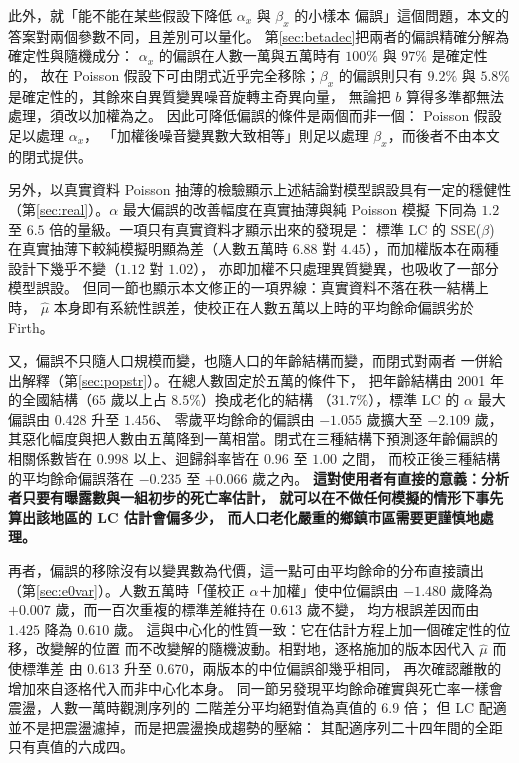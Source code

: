 \documentclass[UTF8, fontset=macnew, a4paper, 12pt]{ctexart}
\begin{document}
此外，就「能不能在某些假設下降低 $\alpha_x$ 與 $\beta_x$ 的小樣本
偏誤」這個問題，本文的答案對兩個參數不同，且差別可以量化。
第\ref{sec:betadec}把兩者的偏誤精確分解為確定性與隨機成分：
$\alpha_x$ 的偏誤在人數一萬與五萬時有 $100\%$ 與 $97\%$ 是確定性的，
故在 Poisson 假設下可由閉式近乎完全移除；$\beta_x$ 的偏誤則只有
$9.2\%$ 與 $5.8\%$ 是確定性的，其餘來自異質變異噪音旋轉主奇異向量，
無論把 $b$ 算得多準都無法處理，須改以加權為之。
因此可降低偏誤的條件是兩個而非一個： Poisson 假設足以處理 $\alpha_x$，
「加權後噪音變異數大致相等」則足以處理 $\beta_x$，而後者不由本文的閉式提供。

另外，以真實資料 Poisson 抽薄的檢驗顯示上述結論對模型誤設具有一定的穩健性
（第\ref{sec:real}）。$\alpha$ 最大偏誤的改善幅度在真實抽薄與純 Poisson 模擬
下同為 $1.2$ 至 $6.5$ 倍的量級。一項只有真實資料才顯示出來的發現是：
標準 LC 的 SSE($\beta$) 在真實抽薄下較純模擬明顯為差（人數五萬時 $6.88$
對 $4.45$），而加權版本在兩種設計下幾乎不變（$1.12$ 對 $1.02$），
亦即加權不只處理異質變異，也吸收了一部分模型誤設。
但同一節也顯示本文修正的一項界線：真實資料不落在秩一結構上時，
$\hat\mu$ 本身即有系統性誤差，使校正在人數五萬以上時的平均餘命偏誤劣於
Firth。

又，偏誤不只隨人口規模而變，也隨人口的年齡結構而變，而閉式對兩者
一併給出解釋（第\ref{sec:popstr}）。在總人數固定於五萬的條件下，
把年齡結構由 2001 年的全國結構（$65$ 歲以上占 $8.5\%$）換成老化的結構
（$31.7\%$），標準 LC 的 $\alpha$ 最大偏誤由 $0.428$ 升至 $1.456$、
零歲平均餘命的偏誤由 $-1.055$ 歲擴大至 $-2.109$ 歲，
其惡化幅度與把人數由五萬降到一萬相當。閉式在三種結構下預測逐年齡偏誤的
相關係數皆在 $0.998$ 以上、迴歸斜率皆在 $0.96$ 至 $1.00$ 之間，
而校正後三種結構的平均餘命偏誤落在 $-0.235$ 至 $+0.066$ 歲之內。
\textbf{這對使用者有直接的意義：分析者只要有曝露數與一組初步的死亡率估計，
就可以在不做任何模擬的情形下事先算出該地區的 LC 估計會偏多少，
而人口老化嚴重的鄉鎮市區需要更謹慎地處理。}

再者，偏誤的移除沒有以變異數為代價，這一點可由平均餘命的分布直接讀出
（第\ref{sec:e0var}）。人數五萬時「僅校正 $\alpha$＋加權」使中位偏誤由
$-1.480$ 歲降為 $+0.007$ 歲，而一百次重複的標準差維持在 $0.613$ 歲不變，
均方根誤差因而由 $1.425$ 降為 $0.610$ 歲。
這與中心化的性質一致：它在估計方程上加一個確定性的位移，改變解的位置
而不改變解的隨機波動。相對地，逐格施加的版本因代入 $\hat\mu$ 而使標準差
由 $0.613$ 升至 $0.670$，兩版本的中位偏誤卻幾乎相同，
再次確認離散的增加來自逐格代入而非中心化本身。
同一節另發現平均餘命確實與死亡率一樣會震盪，人數一萬時觀測序列的
二階差分平均絕對值為真值的 $6.9$ 倍；
但 LC 配適並不是把震盪濾掉，而是把震盪換成趨勢的壓縮：
其配適序列二十四年間的全距只有真值的六成四。
\end{document}
